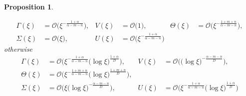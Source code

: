 \documentclass[a4paper,11pt]{article}
\def\BO{{\mathcal{O}}}
\newtheorem{proposition}{Proposition}[section]
\theoremstyle{remark}
\begin{document}
\begin{proposition}
\begin{enumerate}
  \begin{equation} \label{eq:ss_asymp1}
  \begin{aligned}
    \Gamma(\xi) &= \BO\big(\xi^{-\frac{1+\alpha}{\alpha-m-n}}), & V(\xi) &= \BO\big(1), &    \Theta(\xi) &= \BO\big(\xi^{-\frac{1+m+n}{\alpha-m-n}}),\\
   \Sigma(\xi) &= \BO\big(\xi), &   U(\xi) &= \BO\big(\xi^{-\frac{1+\alpha}{\alpha-m-n}})
  \end{aligned}
  \end{equation}
  otherwise
    \begin{equation} \label{eq:ss_asymp2}
  \begin{aligned}
    \Gamma(\xi) &= \BO\big(\xi^{-\frac{1+\alpha}{\alpha-m-n}}\big(\log\xi\big)^{\frac{1+\alpha}{D}}\big), & V(\xi) &= \BO\big(\big(\log\xi\big)^{-\frac{\alpha-m-n}{D}}\big),
    \\ 
        \Theta(\xi) &= \BO\big(\xi^{-\frac{1+m+n}{\alpha-m-n}}\big(\log\xi\big)^{\frac{1+m+n}{D}}\big),\\
   \Sigma(\xi) &= \BO\big(\xi\big(\log\xi\big)^{-\frac{\alpha-m-n}{D}}\big), &   U(\xi) &= \BO\big(\xi^{-\frac{1+\alpha}{\alpha-m-n}}\big(\log\xi\big)^{\frac{1+\alpha}{D}}\big)
  \end{aligned}
  \end{equation}
 \end{enumerate}

\end{proposition}
\end{document}
